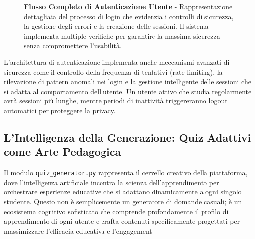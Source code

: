 \documentclass[a4paper, 14pt, oneside]{extbook}
\begin{document}
\begin{figure}[H]
\caption{\textbf{Flusso Completo di Autenticazione Utente} - Rappresentazione dettagliata del processo di login che evidenzia i controlli di sicurezza, la gestione degli errori e la creazione delle sessioni. Il sistema implementa multiple verifiche per garantire la massima sicurezza senza compromettere l'usabilità.}
\label{fig:authentication-flow}
\end{figure}

L'architettura di autenticazione implementa anche meccanismi avanzati di sicurezza come il controllo della frequenza di tentativi (rate limiting), la rilevazione di pattern anomali nei login e la gestione intelligente delle sessioni che si adatta al comportamento dell'utente. Un utente attivo che studia regolarmente avrà sessioni più lunghe, mentre periodi di inattività triggereranno logout automatici per proteggere la privacy.

\subsection{L'Intelligenza della Generazione: Quiz Adattivi come Arte Pedagogica}

Il modulo \texttt{quiz\_generator.py} rappresenta il cervello creativo della piattaforma, dove l'intelligenza artificiale incontra la scienza dell'apprendimento per orchestrare esperienze educative che si adattano dinamicamente a ogni singolo studente. Questo non è semplicemente un generatore di domande casuali; è un ecosistema cognitivo sofisticato che comprende profondamente il profilo di apprendimento di ogni utente e crafta contenuti specificamente progettati per massimizzare l'efficacia educativa e l'engagement.
\end{document}
